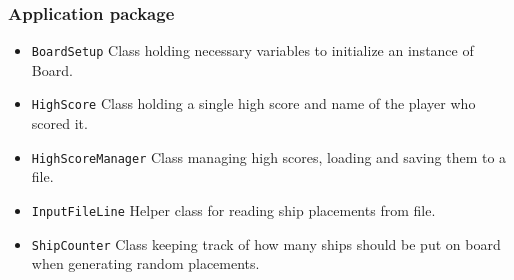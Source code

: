 \documentclass[]{article}
\begin{document}
\subsubsection{Application package}
\begin{itemize}
	\item \texttt{BoardSetup} Class holding necessary variables to initialize an instance of Board.
	\item \texttt{HighScore} Class holding a single high score and name of the player who scored it.
	\item \texttt{HighScoreManager} Class managing high scores, loading and saving them to a file.
	\item \texttt{InputFileLine} Helper class for reading ship placements from file.
	\item \texttt{ShipCounter} Class keeping track of how many ships should be put on board when generating random placements.
\end{itemize}
\end{document}

